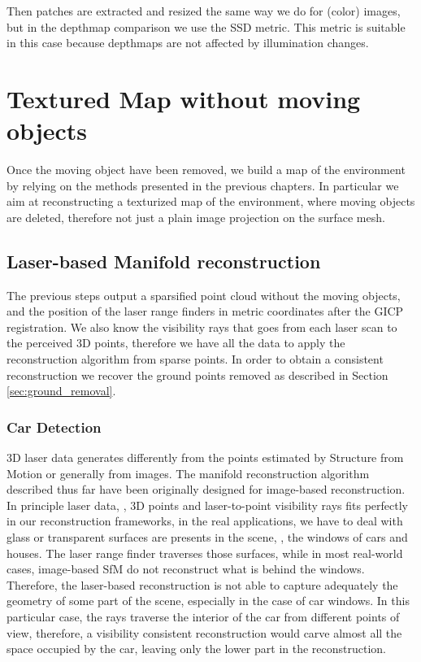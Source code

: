 Then patches are extracted and resized the same way we do for (color) images, but in the depthmap comparison we use the SSD metric. This metric is suitable in this case because depthmaps are not affected by illumination changes.



\section{Textured Map without moving objects}
Once the moving object have been removed, we build a map of the environment by relying on the methods presented in the previous chapters.
In particular we aim at reconstructing a texturized map of the environment, where moving objects are deleted, therefore not just a plain image projection on the surface mesh.
\subsection{Laser-based Manifold reconstruction}
The previous steps output a sparsified point cloud without the moving objects, and the position of the laser range finders in metric coordinates after the GICP registration.
We also know the visibility rays that goes from each laser scan to the perceived 3D points, therefore we have all the data to apply the reconstruction algorithm from sparse points.
In order to obtain a consistent reconstruction we recover the ground points removed as described in Section \ref{sec:ground_removal}.

\subsubsection{Car Detection}
3D laser data generates differently from the points estimated by Structure from Motion or generally from images. 
The manifold reconstruction algorithm described thus far have been originally designed for image-based reconstruction.
In principle laser data, \ie, 3D points and laser-to-point visibility rays fits perfectly in our reconstruction frameworks, in the real applications, we have to deal with glass or transparent surfaces are presents in the scene, \eg, the windows of cars and houses. 
The laser range finder traverses those surfaces, while in most real-world cases, image-based SfM do not reconstruct what is behind the windows.
Therefore, the laser-based reconstruction is not able to capture adequately the geometry of some part of the scene, especially in the case of car windows. 
In this particular case, the rays traverse the interior of the car from different points of view, therefore, a visibility consistent reconstruction would carve almost all the space occupied by the car, leaving only the lower part in the reconstruction.

